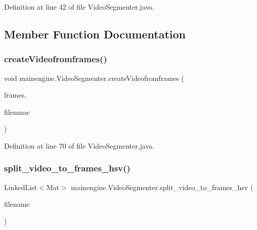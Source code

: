 Definition at line 42 of file Video\+Segmenter.\+java.



\subsection{Member Function Documentation}
\hypertarget{classmainengine_1_1_video_segmenter_a73f78b10d93a3fe04285a69875b50d01}{}\label{classmainengine_1_1_video_segmenter_a73f78b10d93a3fe04285a69875b50d01} 
\subsubsection{\texorpdfstring{create\+Videofromframes()}{createVideofromframes()}}
{\footnotesize\ttfamily void mainengine.\+Video\+Segmenter.\+create\+Videofromframes (\begin{DoxyParamCaption}\item[{Linked\+List$<$ Mat $>$}]{frames,  }\item[{String}]{filenmae }\end{DoxyParamCaption})}



Definition at line 70 of file Video\+Segmenter.\+java.

\hypertarget{classmainengine_1_1_video_segmenter_ae3e987f60b12c66b3c212646f4a1f9f5}{}\label{classmainengine_1_1_video_segmenter_ae3e987f60b12c66b3c212646f4a1f9f5} 
\subsubsection{\texorpdfstring{split\+\_\+video\+\_\+to\+\_\+frames\+\_\+hsv()}{split\_video\_to\_frames\_hsv()}}
{\footnotesize\ttfamily Linked\+List$<$Mat$>$ mainengine.\+Video\+Segmenter.\+split\+\_\+video\+\_\+to\+\_\+frames\+\_\+hsv (\begin{DoxyParamCaption}\item[{String}]{filename }\end{DoxyParamCaption})}

